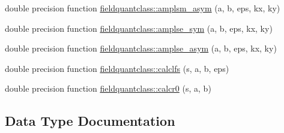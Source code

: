 \begin{DoxyCompactItemize}
\item 
double precision function \mbox{\hyperlink{namespacefieldquantclass_ac67e15255b5d57fb3c3a29ef79addb63}{fieldquantclass\+::amplsm\+\_\+asym}} (a, b, eps, kx, ky)
\item 
double precision function \mbox{\hyperlink{namespacefieldquantclass_a8eb7b870ec7c240279076fbb6269ff07}{fieldquantclass\+::amplse\+\_\+sym}} (a, b, eps, kx, ky)
\item 
double precision function \mbox{\hyperlink{namespacefieldquantclass_a735a6d51aabd219f525edeb04b034150}{fieldquantclass\+::amplse\+\_\+asym}} (a, b, eps, kx, ky)
\item 
double precision function \mbox{\hyperlink{namespacefieldquantclass_a491cfca134ed1bb2dfc47d6de7fdd972}{fieldquantclass\+::calclfs}} (s, a, b, eps)
\item 
double precision function \mbox{\hyperlink{namespacefieldquantclass_a765f0fc87c405fa965c6c966794db11c}{fieldquantclass\+::calcr0}} (s, a, b)
\end{DoxyCompactItemize}


\subsection{Data Type Documentation}
\label{structfieldquantclass_1_1fieldquant}
